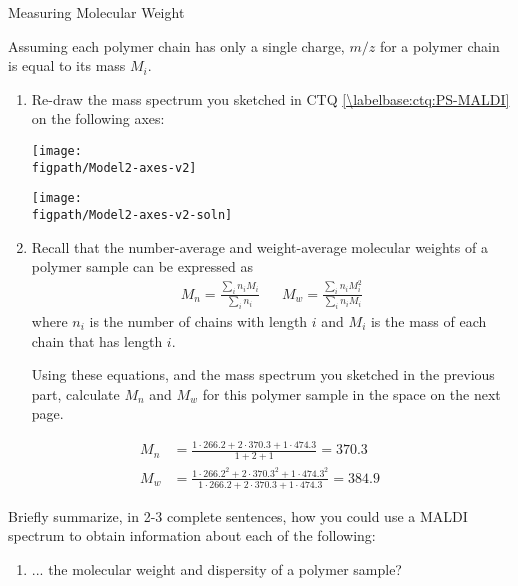 \begin{activity}{Measuring Molecular Weight}
\begin{ctqs}
\begin{enumerate}
		\end{enumerate}
		
	\question Assuming each polymer chain has only a single charge, $m/z$ for a polymer chain is equal to its mass $M_i$.
	
		\begin{enumerate}
			\item Re-draw the mass spectrum you sketched in CTQ \ref{\labelbase:ctq:PS-MALDI} on the following axes:
		
			\begin{solution}[2in]{\centerline{\texttt{[image: \\figpath/Model2-axes-v2]}}}
				\centerline{\texttt{[image: \\figpath/Model2-axes-v2-soln]}}
			\end{solution}
			
			\item Recall that the number-average and weight-average molecular weights of a polymer sample can be expressed as
		\begin{align*}
			M_n = \frac{\sum_i n_i M_i}{\sum_i n_i} && M_w = \frac{\sum_i n_i M_i^2}{\sum_i n_i M_i}
		\end{align*}
		where $n_i$ is the number of chains with length $i$ and $M_i$ is the mass of each chain that has length $i$.
		
				Using these equations, and the mass spectrum you sketched in the previous part, calculate $M_n$ and $M_w$ for this polymer sample in the space on the next page.
		\end{enumerate}
		
		\begin{solution}[3.5in]{}
			\begin{align*}
				M_n &= \frac{1\cdot 266.2 + 2\cdot 370.3 + 1\cdot 474.3}{1 + 2 + 1} = 370.3\\
				M_w &= \frac{1\cdot 266.2^2 + 2\cdot 370.3^2 + 1\cdot 474.3^2}{1\cdot 266.2 + 2\cdot 370.3 + 1\cdot 474.3} = 384.9
			\end{align*}
		\end{solution}
		
	\question Briefly summarize, in 2-3 complete sentences, how you could use a MALDI spectrum to obtain information about each of the following:
	
		\begin{enumerate}
			\item ... the molecular weight and dispersity of a polymer sample?
			
		\begin{solution}[1.5in]{}
		

\end{solution}
\end{enumerate}
\end{ctqs}
\end{activity}
